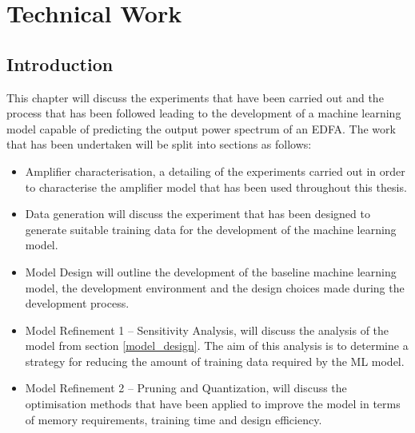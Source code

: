 \chapter{Technical Work}
\label{ch:tw}



\section{Introduction} 
\label{tw:intro}

This chapter will discuss the experiments that have been carried out and the process that has been followed leading to the development of a machine learning model capable of predicting the output power spectrum of an EDFA. 
The work that has been undertaken will be split into sections as follows:
\begin{itemize}
    \item Amplifier characterisation, a detailing of the experiments carried out in order to characterise the amplifier model that has been used throughout this thesis.
    
    \item Data generation will discuss the experiment that has been designed to generate suitable training data for the development of the machine learning model.
    
    \item Model Design will outline the development of the baseline machine learning model, the development environment and the design choices made during the development process.
    
    \item Model Refinement 1 – Sensitivity Analysis, will discuss the analysis of the model from section \ref{model_design}. The aim of this analysis is to determine a strategy for reducing the amount of training data required by the ML model.
    
    \item Model Refinement 2 – Pruning and Quantization, will discuss the optimisation methods that have been applied to improve the model in terms of memory requirements, training time and design efficiency. 
\end{itemize}



